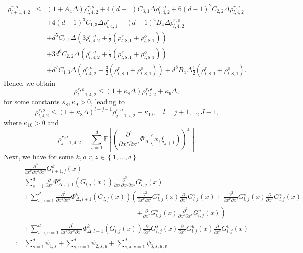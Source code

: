 \documentclass[11pt,a4paper]{amsart}
\theoremstyle{plain}
\theoremstyle{definition}
\theoremstyle{remark}
\numberwithin{equation}{section}
\newcommand*{\EE}{\mathbb E}
\renewcommand*{\doteq}{:=}
\begin{document}
\begin{eqnarray*}
\rho_{l+1,4,2}^{r,o}
&\le & (1+A_{4}\Delta)\rho_{l,4,2}^{r,o}
+4(d-1)C_{3,1}\Delta\rho_{l,4,2}^{r,o}+6(d-1)^2C_{2,2}\Delta\rho_{l,4,2}^{r,o}\\
&&+4(d-1)^3C_{1,3}\Delta\rho_{l,4,1}^{r}+ (d-1)^4B_{4}\Delta\rho_{l,4,2}^{r,o}\\
&&+d^5C_{3,1}\Delta\left(3\rho_{l,4,2}^{r,o}+\frac{1}{2}\left(\rho_{l,8,1}^{r}+\rho_{l,8,1}^{o}\right)\right)\\
&&+3d^6C_{2,2}\Delta\left(\rho_{l,4,2}^{r,o}+\frac{1}{2}\left(\rho_{l,8,1}^{r}+\rho_{l,8,1}^{o}\right)\right)\\
&&+d^7C_{1,3}\Delta\left(\rho_{l,4,2}^{r,o}+\frac{3}{2}\left(\rho_{l,8,1}^{r}+\rho_{l,8,1}^{o}\right)\right)+d^8B_{4}\Delta\frac{1}{2}\left(\rho_{l,8,1}^{r}+\rho_{l,8,1}^{o}\right).
\end{eqnarray*}
Hence, we obtain
\[
\rho_{l+1,4,2}^{r,o}\leq (1+\kappa_{8}\Delta)\rho_{l,4,2}^{r,o}+\kappa_9\Delta,
\]
for some constants $\kappa_{8},\kappa_9>0$, leading to 
\[
\rho_{l,4,2}^{r,o}\leq(1+\kappa_{8}\Delta)^{l-j-1}\rho_{j+1,4,2}^{r,o}+\kappa_{10}
,\quad l=j+1,\ldots,J-1,
\]
where $\kappa_{10}>0$ and
\[
\rho_{j+1,4,2}^{r,o}=\sum_{s=1}^d\EE\left[\left(\frac{\partial^2}{\partial x^r\partial x^o}\Phi_{\Delta}^s\left(x,\xi_{j+1}\right)\right)^{4}\right].
\]
Next, we have for some $k,o,r,z\in\left\{1,\ldots,d\right\}$
\begin{align*}
\phantom{=:}&\frac{\partial^3}{\partial x^r\partial x^o\partial x^z}G_{l+1,j}^k(x)\\
=\phantom{:}&\sum_{s=1}^d\frac{\partial}{\partial x^s}\Phi_{\Delta,l+1}^k(G_{l,j}(x))\frac{\partial^3}{\partial x^r\partial x^o\partial x^z}G_{l,j}^s(x)\\
&+\sum_{s,u=1}^d\frac{\partial^2}{\partial x^s\partial x^u}\Phi_{\Delta,l+1}^k(G_{l,j}(x))\left(\frac{\partial^2}{\partial x^r\partial x^o}G_{l,j}^s(x)\frac{\partial}{\partial x^z}G_{l,j}^u(x)+\frac{\partial^2}{\partial x^r\partial x^z}G_{l,j}^s(x)\frac{\partial}{\partial x^o}G_{l,j}^u(x)\right.\\
&\phantom{+\sum_{s,u=1}^d\frac{\partial^2}{\partial x^s\partial x^u}\Phi_{\Delta,l+1}^k(G_{l,j}(x))\left(\right.}\left.+\frac{\partial}{\partial x^r}G_{l,j}^s(x)\frac{\partial^2}{\partial x^o\partial x^z}G_{l,j}^u(x)\right)\\
&+\sum_{s,u,v=1}^d\frac{\partial^3}{\partial x^s\partial x^u\partial x^v}\Phi_{\Delta,l+1}^k(G_{l,j}(x))\frac{\partial}{\partial x^r}G_{l,j}^s(x)\frac{\partial}{\partial x^o}G_{l,j}^u(x)\frac{\partial}{\partial x^z}G_{l,j}^v(x)\\
=:&\sum_{s=1}^d\psi_{1,s}+\sum_{s,u=1}^d\psi_{2,s,u}+\sum_{s,u,v=1}^d\psi_{3,s,u,v}
\end{align*}
\end{document}
